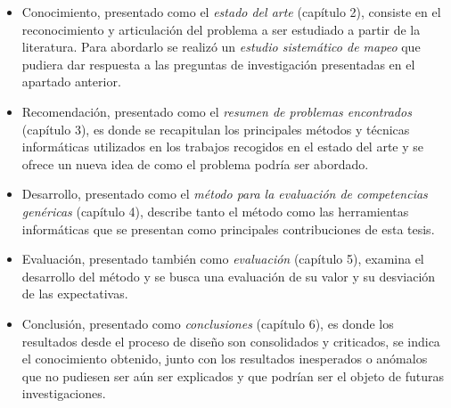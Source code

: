 \begin{itemize}
\item Conocimiento, presentado como el \emph{estado del arte} (capítulo 2), consiste en el reconocimiento y articulación del problema a ser estudiado a partir de la literatura. Para abordarlo se realizó un \emph{estudio sistemático de mapeo} que pudiera dar respuesta a las preguntas de investigación presentadas en el apartado anterior.
\item Recomendación, presentado como el \emph{resumen de problemas encontrados} (capítulo 3), es donde se recapitulan los principales métodos y técnicas informáticas utilizados en los trabajos recogidos en el estado del arte y se ofrece un nueva idea de como el problema podría ser abordado. 
\item Desarrollo, presentado como el \emph{método para la evaluación de competencias genéricas} (capítulo 4), describe tanto el método como las herramientas informáticas que se presentan como principales contribuciones de esta tesis.
\item Evaluación, presentado también como \emph{evaluación} (capítulo 5), examina el desarrollo del método y se busca una evaluación de su valor y su desviación de las expectativas.
\item Conclusión, presentado como \emph{conclusiones} (capítulo 6), es donde los resultados desde el proceso de diseño son consolidados y criticados, se indica el conocimiento obtenido, junto con los resultados inesperados o anómalos que no pudiesen ser aún ser explicados y que podrían ser el objeto de futuras investigaciones.
\end{itemize}






